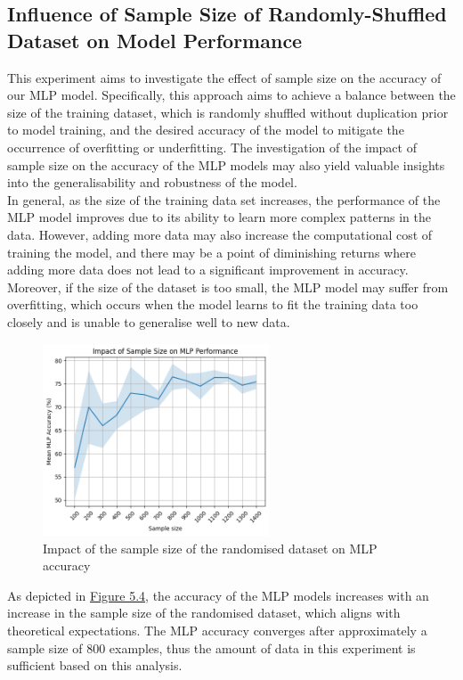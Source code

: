 \documentclass[11pt, a4paper]{report}
\begin{document}
\subsection{Influence of Sample Size of Randomly-Shuffled Dataset on Model Performance}\label{sec:5.3.2}
This experiment aims to investigate the effect of sample size on the accuracy of our MLP model. Specifically, this approach aims to achieve a balance between the size of the training dataset, which is randomly shuffled without duplication prior to model training, and the desired accuracy of the model to mitigate the occurrence of overfitting or underfitting. The investigation of the impact of sample size on the accuracy of the MLP models may also yield valuable insights into the generalisability and robustness of the model.\\

In general, as the size of the training data set increases, the performance of the MLP model improves due to its ability to learn more complex patterns in the data. However, adding more data may also increase the computational cost of training the model, and there may be a point of diminishing returns where adding more data does not lead to a significant improvement in accuracy. Moreover, if the size of the dataset is too small, the MLP model may suffer from overfitting, which occurs when the model learns to fit the training data too closely and is unable to generalise well to new data.
\begin{figure}[H]
    \centering 
    \includegraphics[width=0.6\textwidth]{docs/Project Report/Media/5_3_2_exp2_plot.png}
    \caption{Impact of the sample size of the randomised dataset on MLP accuracy}
    \label{fig:5.4}
\end{figure}
As depicted in \hyperref[fig:5.4]{Figure 5.4}, the accuracy of the MLP models increases with an increase in the sample size of the randomised dataset, which aligns with theoretical expectations. The MLP accuracy converges after approximately a sample size of 800 examples, thus the amount of data in this experiment is sufficient based on this analysis.
\end{document}

